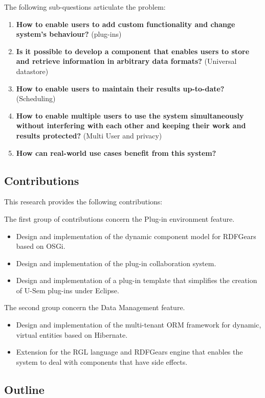 The following sub-questions articulate the problem:

\begin{enumerate}
\item \textbf{How to enable users to add custom functionality and change system's behaviour?} (plug-ins)

\item \textbf{Is it possible to develop a component that enables users to store and retrieve information in arbitrary data formats?} (Universal datastore)

\item \textbf{How to enable users to maintain their results up-to-date?}  (Scheduling)


\item \textbf{How to enable multiple users to use the system simultaneously without interfering with each other and keeping their work and results protected?} (Multi User and privacy)


\item \textbf{How can real-world use cases benefit from this system?}

\end{enumerate}

\subsection{Contributions}
This research provides the following contributions:

The first group of contributions concern the Plug-in environment feature.
\begin{itemize}
	\item Design and implementation of the dynamic component model for RDFGears based on OSGi.
	\item Design and implementation of the plug-in collaboration system.
	\item Design and implementation of a plug-in template that simplifies the creation of U-Sem plug-ins under Eclipse.
\end{itemize}

The second group concern the Data Management feature.
\begin{itemize}
	\item Design and implementation of the multi-tenant ORM framework for dynamic, virtual entities based on Hibernate.
	\item Extension for the RGL language and RDFGears engine that enables the system to deal with components that have side effects.
\end{itemize}

\subsection{Outline}


